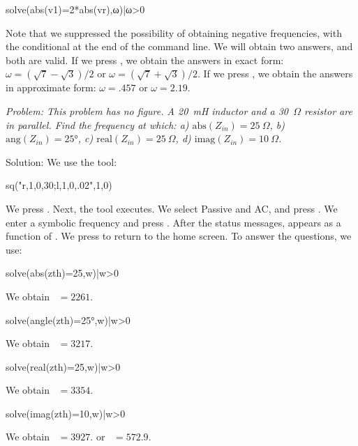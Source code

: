 \begin{entry}
solve(abs(v1)=2*abs(vr),ω)|ω>0
\end{entry}

Note that we suppressed the possibility of obtaining negative
frequencies, with the conditional at the end of the command line. We
will obtain two answers, and both are valid. If we press
, we obtain the answers in exact form:
$\omega = (\sqrt7 - \sqrt3)/2$ or $\omega = (\sqrt7 + \sqrt3)/2$. If
we press \key{$\diamond$} , we obtain the answers in
approximate form: $\omega = .457$ or $\omega = 2.19$.


\emph{Problem: This problem has no figure. A 20~mH inductor and a
30~$\Omega$ resistor are in parallel. Find the frequency at which:
a) $\mathrm{abs}(Z_{in}) = 25~\Omega$, b)
$\mathrm{ang}(Z_{in}) = 25°$, c) $\mathrm{real}(Z_{in}) =
25~\Omega$, d) $\mathrm{imag}(Z_{in}) = 10~\Omega$.}

Solution: We use the  tool:

\begin{entry}
sq\thevenin("r,1,0,30;l,1,0,.02",1,0)
\end{entry}

We press . Next, the tool executes. We select Passive and
AC, and press . We enter a symbolic frequency 
and press . After the status messages,  appears
as a function of . We press  to return to the
home screen. To answer the questions, we use:

\begin{entry}
solve(abs(zth)=25,w)|w>0
\end{entry}

We obtain ~$= 2261$.

\begin{entry}
solve(angle(zth)=25°,w)|w>0
\end{entry}

We obtain ~$= 3217$.

\begin{entry}
solve(real(zth)=25,w)|w>0
\end{entry}

We obtain ~$= 3354$.

\begin{entry}
solve(imag(zth)=10,w)|w>0
\end{entry}

We obtain ~$= 3927.$ or ~$= 572.9$.

